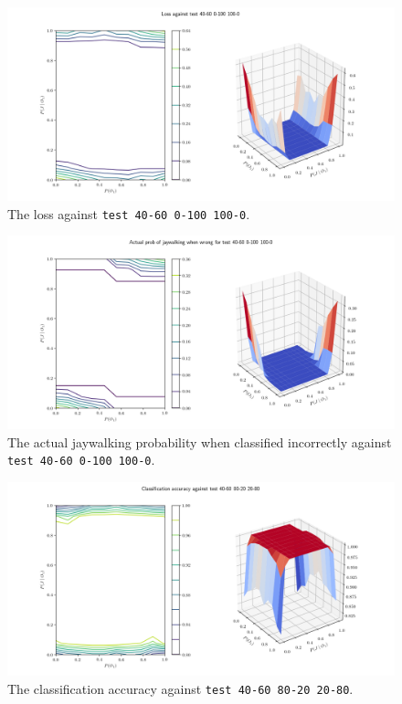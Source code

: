 \documentclass{report}
\newcommand{\code}{\texttt}
\begin{document}
\begin{figure}[h]
    \centering
    \centerline{\includegraphics[scale=0.55]{test_40-60_0-100_100-0_loss.png}}
    \caption[]{The loss against \code{test 40-60 0-100 100-0}.}
    \label{fig:test_40-60_0-100_100-0_loss_plot}
\end{figure}

\begin{figure}[h]
    \centering
    \centerline{\includegraphics[scale=0.55]{test_40-60_0-100_100-0_jay_prob.png}}
    \caption[]{The actual jaywalking probability when classified incorrectly against \code{test 40-60 0-100 100-0}.}
    \label{fig:test_40-60_0-100_100-0_jay_prob_plot}
\end{figure}

% 
% 

\begin{figure}[h]
    \centering
    \centerline{\includegraphics[scale=0.55]{test_40-60_80-20_20-80_accuracy.png}}
    \caption[]{The classification accuracy against \code{test 40-60 80-20 20-80}.}
    \label{fig:test_40-60_80-20_20-80_accuracy_plot}
\end{figure}
\end{document}
